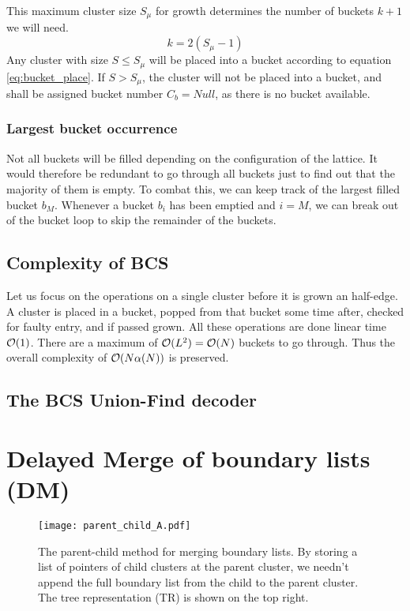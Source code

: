 This maximum cluster size $S_\mu$ for growth determines the number of buckets $k + 1$ we will need.
\begin{equation}\label{eq:bucket_numbuckets}
  k = 2(S_\mu-1)
\end{equation}
Any cluster with size $S\leq S_\mu$ will be placed into a bucket according to equation \eqref{eq:bucket_place}. If $S>S_\mu$, the cluster will not be placed into a bucket, and shall be assigned bucket number $C_b=Null$, as there is no bucket available.



\subsubsection{Largest bucket occurrence}
Not all buckets will be filled depending on the configuration of the lattice. It would therefore be redundant to go through all buckets just to find out that the majority of them is empty. To combat this, we can keep track of the largest filled bucket $b_M$. Whenever a bucket $b_i$ has been emptied and $i = M$, we can break out of the bucket loop to skip the remainder of the buckets.

\subsection{Complexity of BCS}
Let us focus on the operations on a single cluster before it is grown an half-edge. A cluster is placed in a bucket, popped from that bucket some time after, checked for faulty entry, and if passed grown. All these operations are done linear time $\mathcal{O}(1)$. There are a maximum of $\mathcal{O}(L^2) = \mathcal{O}(N)$ buckets to go through. Thus the overall complexity of $\mathcal{O}(N\alpha(N))$ is preserved.

\subsection{The BCS Union-Find decoder}




\section{Delayed Merge of boundary lists (DM)}

\begin{figure}
  \centering
  \texttt{[image: parent\_child\_A.pdf]}
  \caption{The parent-child method for merging boundary lists. By storing a list of pointers of child clusters at the parent cluster, we needn't append the full boundary list from the child to the parent cluster. The tree representation (TR) is shown on the top right. } \label{3.fig.parentchildA}
\end{figure}


